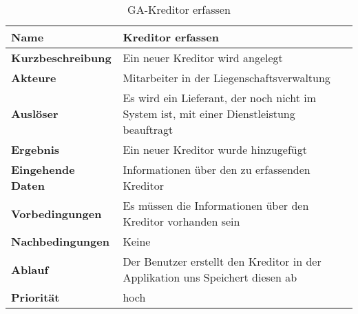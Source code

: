 \begin{table}[H]
  \centering
  \settowidth{}
  \setlength\extrarowheight{2pt}
  \begin{tabulary}{1.0\textwidth}{|a|m{12cm}|}
    \hline
    \textbf{Name}& Kreditor erfassen\\
    \hline 
    \textbf{Kurzbeschreibung} & Ein neuer Kreditor wird angelegt\\
    \hline
    \textbf{Akteure} & Mitarbeiter in der Liegenschaftsverwaltung\\
    \hline
    \textbf{Auslöser} & Es wird ein Lieferant, der noch nicht im System ist, mit einer Dienstleistung beauftragt\\
    \hline
    \textbf{Ergebnis} & Ein neuer Kreditor wurde hinzugefügt\\
    \hline
    \textbf{Eingehende Daten} & Informationen über den zu erfassenden Kreditor\\
    \hline
    \textbf{Vorbedingungen} & Es müssen die Informationen über den Kreditor vorhanden sein\\
    \hline
    \textbf{Nachbedingungen} & Keine\\
    \hline
    \textbf{Ablauf} & Der Benutzer erstellt den Kreditor in der Applikation uns Speichert diesen ab\\
    \hline
    \textbf{Priorität} & hoch\\
    \hline
  \end{tabulary}
  \caption{GA-Kreditor erfassen}
\end{table}

